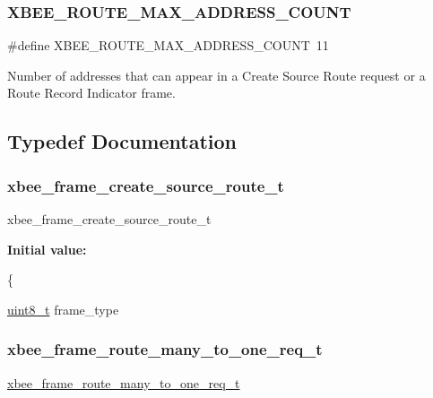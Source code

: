 \subsubsection{\texorpdfstring{X\+B\+E\+E\+\_\+\+R\+O\+U\+T\+E\+\_\+\+M\+A\+X\+\_\+\+A\+D\+D\+R\+E\+S\+S\+\_\+\+C\+O\+U\+NT}{XBEE\_ROUTE\_MAX\_ADDRESS\_COUNT}}
{\footnotesize\ttfamily \#define X\+B\+E\+E\+\_\+\+R\+O\+U\+T\+E\+\_\+\+M\+A\+X\+\_\+\+A\+D\+D\+R\+E\+S\+S\+\_\+\+C\+O\+U\+NT~11}



Number of addresses that can appear in a Create Source Route request or a Route Record Indicator frame. 



\subsection{Typedef Documentation}
\mbox{\label{group__xbee__route_gaa778ab3d89227051a2e7da507d4802bd}} 
\subsubsection{\texorpdfstring{xbee\+\_\+frame\+\_\+create\+\_\+source\+\_\+route\+\_\+t}{xbee\_frame\_create\_source\_route\_t}}
{\footnotesize\ttfamily xbee\+\_\+frame\+\_\+create\+\_\+source\+\_\+route\+\_\+t}

{\bfseries Initial value\+:}
\begin{DoxyCode}
\{
   
   \hyperlink{group__hal__dos_gae1affc9ca37cfb624959c866a73f83c2}{uint8\_t}          frame\_type
\end{DoxyCode}
\mbox{\label{group__xbee__route_gafc3f728061ea39f21f16bc8ac5d443bd}} 
\subsubsection{\texorpdfstring{xbee\+\_\+frame\+\_\+route\+\_\+many\+\_\+to\+\_\+one\+\_\+req\+\_\+t}{xbee\_frame\_route\_many\_to\_one\_req\_t}}
{\footnotesize\ttfamily \hyperlink{group__xbee__route_gafc3f728061ea39f21f16bc8ac5d443bd}{xbee\+\_\+frame\+\_\+route\+\_\+many\+\_\+to\+\_\+one\+\_\+req\+\_\+t}}

